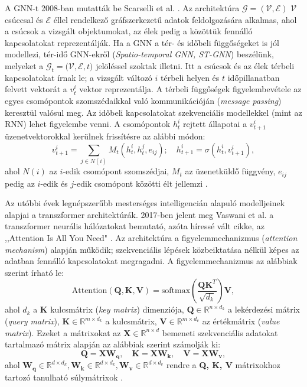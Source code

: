 \documentclass[12pt,a4paper]{article}
\begin{document}
A GNN-t 2008-ban mutatták be Scarselli et al. \cite{scarselli_graph_2008}. Az architektúra $\mathcal{G}=(\mathcal{V, E})$ $\mathcal{V}$ csúccsal és $\mathcal{E}$ éllel rendelkező gráfszerkezetű adatok feldolgozására alkalmas, ahol a csúcsok a vizsgált objektumokat, az élek pedig a közöttük fennálló kapcsolatokat reprezentálják. Ha a GNN a tér- és időbeli függőségeket is jól modellezi, tér-idő GNN-ekről (\textit{Spatio-temporal GNN, ST-GNN}) beszélünk, melyeket a $\mathcal{G}_t=\mathcal{(V,E},t)$ jelöléssel szoktak illetni. Itt a csúcsok és az élek térbeli kapcsolatokat írnak le; a vizsgált változó $i$ térbeli helyen és $t$ időpillanatban felvett vektorát a $v_t^i$ vektor reprezentálja. A térbeli függőségek figyelembevétele az egyes csomópontok szomszédaikkal való kommunikációján (\textit{message passing}) keresztül valósul meg. Az időbeli kapcsolatokat szekvenciális modellekkel (mint az RNN) lehet figyelembe venni. A csomópontok $h_t^i$ rejtett állapotai a $v^i_{t+1}$ üzenetvektorokkal kerülnek frissítésre az alábbi módon:
\[
v_{t+1}^i = \sum_{j \in N(i)} M_t(h_t^i, h_t^j, e_{ij}); \quad h_{t+1}^i = \sigma(h_t^i, v_{t+1}^i),
\]
ahol $N(i)$ az $i$-edik csomópont szomszédjai, $M_t$ az üzenetküldő függvény, $e_{ij}$ pedig az $i$-edik és $j$-edik csomópont közötti élt jellemzi \cite{shi_deep_2025}.

Az utóbbi évek legnépszerűbb mesterséges intelligencián alapuló modelljeinek alapjai a transzformer architektúrák. 2017-ben jelent meg Vaswani et al. a transzformer neurális hálózatokat bemutató, azóta híressé vált cikke, az ,,Attention Is All You Need" \cite{vaswani_attention_2017}. Az architektúra a figyelemmechanizmus (\textit{attention mechanism}) alapján működik; szekvenciális lépések közbeiktatása nélkül képes az adatban fennálló kapcsolatokat megragadni. A figyelemmechanizmus az alábbiak szerint írható le:
\[
\text{Attention}(\mathbf{Q, K, V})=\text{softmax}\left(\frac{\mathbf{QK}^T}{\sqrt{d_k}} \right)\textbf{V},
\]
ahol $d_k$ a \textbf{K} kulcsmátrix (\textit{key matrix}) dimenziója, $\mathbf{Q}\in\mathbb{R}^{n \times d_k}$ a lekérdezési mátrix (\textit{query matrix}), $\mathbf{K}\in\mathbb{R}^{m \times d_k}$ a kulcsmátrix, $\mathbf{V}\in\mathbb{R}^{m \times d_v}$ az értékmátrix (\textit{value matrix}). Ezeket a mátrixokat az $\mathbf{X}\in \mathbb{R}^{n \times d}$ bemeneti szekvenciális adatokat tartalmazó mátrix alapján az alábbiak szerint számolják ki:
\[
\mathbf{Q=XW_q, \quad K=XW_k, \quad V=XW_v},
\]
ahol $\mathbf{W_q} \in \mathbb{R}^{d \times d_k}, \mathbf{W_k} \in \mathbb{R}^{d \times d_k}, \mathbf{W_v} \in \mathbb{R}^{d \times d_v}$ rendre a \textbf{Q, K, V} mátrixokhoz tartozó tanulható súlymátrixok \cite{shi_deep_2025}.
\end{document}
